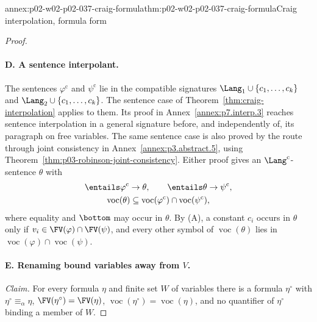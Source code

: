 \begin{annexitem}{annex:p02-w02-p02-037-craig-formula}{thm:p02-w02-p02-037-craig-formula}{Craig interpolation, formula form}
\begin{proof}
\paragraph{D. A sentence interpolant.}
The sentences \(\varphi^{\mathrm{c}}\) and \(\psi^{\mathrm{c}}\) lie in the compatible
signatures \(\Lang_1\cup\{c_1,\ldots,c_k\}\) and
\(\Lang_2\cup\{c_1,\ldots,c_k\}\).  The sentence case of
Theorem~\ref{thm:craig-interpolation} applies to them.  Its proof in
Annex~\ref{annex:p7.interp.3} reaches sentence interpolation in a general
signature before, and independently of, its paragraph on free variables.
The same sentence case is also proved by the route through joint
consistency in Annex~\ref{annex:p3.abstract.5}, using
Theorem~\ref{thm:p03-robinson-joint-consistency}.  Either proof gives an
\(\Lang^{\mathrm{c}}\)-sentence \(\theta\) with
\[
\begin{gathered}
 \entails\varphi^{\mathrm{c}}\to\theta,
 \qquad
 \entails\theta\to\psi^{\mathrm{c}},\\
 \operatorname{voc}(\theta)\subseteq
   \operatorname{voc}(\varphi^{\mathrm{c}})\cap\operatorname{voc}(\psi^{\mathrm{c}}),
\end{gathered}
\]
where equality and \(\bottom\) may occur in \(\theta\).  By (A), a
constant \(c_i\) occurs in \(\theta\) only if
\(v_i\in\FV(\varphi)\cap\FV(\psi)\), and every other symbol of
\(\operatorname{voc}(\theta)\) lies in
\(\operatorname{voc}(\varphi)\cap\operatorname{voc}(\psi)\).

\paragraph{E. Renaming bound variables away from \(V\).}
\emph{Claim.}  For every formula \(\eta\) and finite set \(W\) of variables
there is a formula \(\eta^{\circ}\) with
\(\eta^{\circ}\equiv_\alpha\eta\),
\(\FV(\eta^{\circ})=\FV(\eta)\),
\(\operatorname{voc}(\eta^{\circ})=\operatorname{voc}(\eta)\), and no
quantifier of \(\eta^{\circ}\) binding a member of \(W\).


\end{proof}
\end{annexitem}
